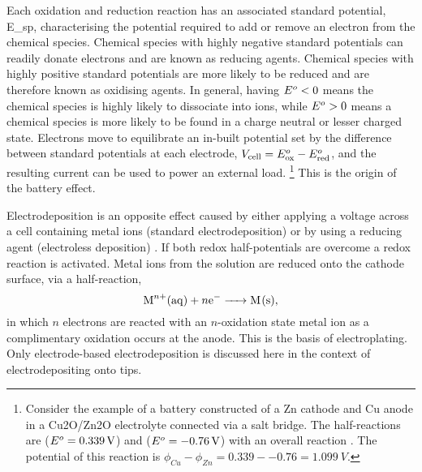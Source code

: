 \documentclass{article}
\begin{document}
Each oxidation and reduction reaction has an associated standard potential, \gls{E_sp}, characterising the  potential required to add or remove an electron from the chemical species. Chemical species with highly negative standard potentials can readily donate electrons and are known as reducing agents. Chemical species with highly positive standard potentials are more likely to be reduced and are therefore known as oxidising agents. In general, having $E^o<0$ means the chemical species is highly likely to dissociate into ions, while $E^o>0$ means a chemical species is more likely to be found in a charge neutral or lesser charged state.
Electrons move to equilibrate an in-built potential set by the difference between standard potentials at each electrode, $V_{\mathrm{cell}} = E^o_{\mathrm{ox}}-E^o_{\mathrm{red}}$, and the resulting current can be used to power an external load.%
\footnote{Consider the example of a battery constructed of a Zn cathode and Cu anode in a Cu\subs2O/Zn\subs2O electrolyte connected via a salt bridge. The half-reactions are  ($E^o=\SI{0.339}{V}$) and  ($E^o=\SI{-0.76}{V}$) with an overall reaction . The potential of this reaction is $\phi_{Cu}-\phi_{Zn}=0.339--0.76=\SI{1.099}{V}$.}
This is the origin of the battery effect.

Electrodeposition is an opposite effect caused by either applying a voltage across a cell containing metal ions (standard electrodeposition) or by using a reducing agent (electroless deposition) \cite{paunovic2006fundamentals}. If both redox half-potentials are overcome a redox reaction is activated. Metal ions from the solution are reduced onto the cathode surface, via a half-reaction,
\begin{equation} \ce{M^{$n$+}(aq) + $n$e- -> M(s)}, \end{equation}
in which $n$ electrons are reacted with an $n$-oxidation state metal ion as a complimentary oxidation occurs at the anode. This is the basis of electroplating. Only electrode-based electrodeposition is discussed here in the context of electrodepositing onto tips.
\end{document}
